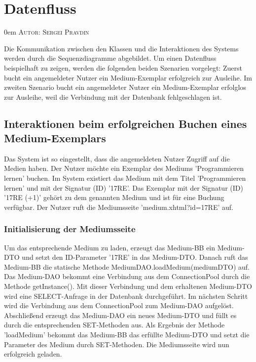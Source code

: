 \documentclass{article}
\makeatletter
\newcommand{\sectionauthor}[1]{
	{\parindent 0em \large \scshape Autor: #1 \par \nobreak \vspace*{1em}}
	\@afterheading
}
\makeatother
\begin{document}
\section{Datenfluss}
\sectionauthor{Sergei Pravdin}
Die Kommunikation zwischen den Klassen und die Interaktionen des Systems werden durch die Sequenzdiagramme abgebildet. Um einen Datenfluss beispielhaft zu zeigen, werden die folgenden beiden Szenarien vorgelegt: Zuerst bucht ein angemeldeter Nutzer ein Medium-Exemplar erfolgreich zur Ausleihe. Im zweiten Szenario bucht ein angemeldeter Nutzer ein Medium-Exemplar erfolglos zur Ausleihe, weil die Verbindung mit der Datenbank fehlgeschlagen ist.
\subsection{Interaktionen beim erfolgreichen Buchen eines Medium-Exemplars}
Das System ist so eingestellt, dass die angemeldeten Nutzer Zugriff auf die Medien haben. Der Nutzer möchte ein Exemplar des Mediums 'Programmieren lernen' buchen. Im System existiert das Medium mit dem Titel 'Programmieren lernen' und mit der Signatur (ID) '17RE'. Das Exemplar mit der Signatur (ID) '17RE (+1)' gehört zu dem genannten Medium und ist für eine Buchung verfügbar. Der Nutzer ruft die Mediumsseite 'medium.xhtml?id=17RE' auf.
\subsubsection{Initialisierung der Mediumsseite}
Um das entsprechende Medium zu laden, erzeugt das Medium-BB ein Medium-DTO und setzt den ID-Parameter '17RE' in das Medium-DTO. Danach ruft das Medium-BB die statische Methode MediumDAO.loadMedium(mediumDTO) auf. Das Medium-DAO bekommt eine Verbindung aus dem ConnectionPool durch die Methode getInstance(). Mit dieser Verbindung und dem erhaltenen Medium-DTO wird eine SELECT-Anfrage in der Datenbank durchgeführt. Im nächsten Schritt wird die Verbindung aus dem ConnectionPool zum Medium-DAO aufgelöst. Abschließend erzeugt das Medium-DAO ein neues Medium-DTO und füllt es durch die entsprechenden SET-Methoden aus. Als Ergebnis der Methode 'loadMedium' bekommt das Medium-BB das erfüllte Medium-DTO und setzt die Parameter des Medium durch SET-Methoden. Die Mediumsseite wird nun erfolgreich geladen.
\end{document}
